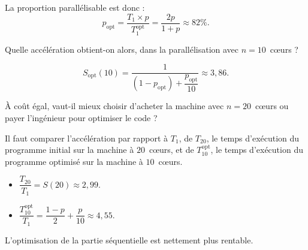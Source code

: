 \begin{exercice}
\begin{corrections}
    La proportion parallélisable est donc :
    $$ p_{\mathrm{opt}} = \dfrac{T_1 \times p}{T_1^{\mathrm{opt}}} = \dfrac{2p}{1+p} \approx 82\%. $$
  \end{corrections}
  
  \begin{questions} 
  \item Quelle accélération obtient-on alors, dans la parallélisation avec $n = 10$~c\oe urs ?
  \end{questions}
  \begin{corrections}
    $$ S_{\mathrm{opt}}(10)=\dfrac{1}{(1-p_{\mathrm{opt}})+\dfrac{p_{\mathrm{opt}}}{10}} \approx 3,86. $$
  \end{corrections}

  \begin{questions} 
  \item À coût égal, vaut-il mieux choisir d'acheter la machine avec $n=20$~c\oe urs ou payer l'ingénieur pour optimiser le code ? 
  \end{questions}
  \begin{corrections}
    Il faut comparer l'accélération par rapport à $T_{1}$,
    de $T_{20}$, le temps d'exécution du programme initial sur la machine à $20$~c\oe urs,
    et de $T_{10}^{\mathrm{opt}}$, le temps d'exécution du programme optimisé sur la machine à $10$~c\oe urs.
    \begin{itemize}
    \item $\dfrac{T_{20}}{T_1} = S(20) \approx 2,99.$
    \item $\dfrac{T^{\mathrm{opt}}_{10}}{T_1} = \dfrac{1-p}{2} + \dfrac{p}{10} \approx 4,55.$
    \end{itemize}    

    L'optimisation de la partie séquentielle est nettement plus rentable.
  \end{corrections}
  
\end{exercice}

\endgroup
\endinput
